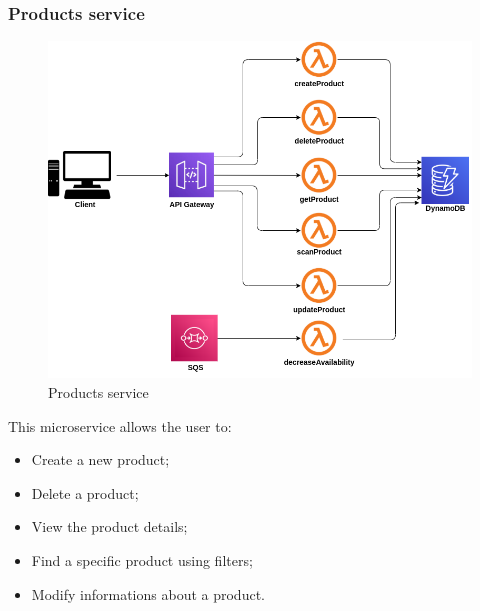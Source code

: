 \subsubsection{Products service}
\begin{figure}[!h]
    \vspace{5px}
    \includegraphics[scale=0.5]{../../../../Images/Diagrammi/maintainerManual/productService.png}
    \centering
    \caption{Products service}
\end{figure}
This microservice allows the user to:
\begin{itemize}
    \item Create a new product;
    \item Delete a product;
    \item View the product details;
    \item Find a specific product using filters;
    \item Modify informations about a product.
\end{itemize}
\pagebreak
